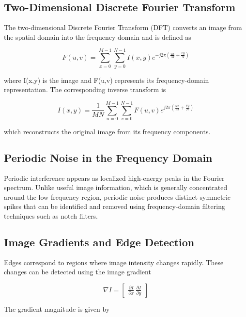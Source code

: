\documentclass[10pt, a4paper, twocolumn]{article}
\begin{document}
\subsection{Two-Dimensional Discrete Fourier Transform}

The two-dimensional Discrete Fourier Transform (DFT) converts an image from the spatial domain into the frequency domain and is defined as

\begin{equation}
F(u,v)=\sum_{x=0}^{M-1}\sum_{y=0}^{N-1}
I(x,y)e^{-j2\pi\left(\frac{ux}{M}+\frac{vy}{N}\right)}
\end{equation}

where I(x,y) is the image and F(u,v) represents its frequency-domain representation. The corresponding inverse transform is

\begin{equation}
I(x,y)=\frac{1}{MN}
\sum_{u=0}^{M-1}\sum_{v=0}^{N-1}
F(u,v)e^{j2\pi\left(\frac{ux}{M}+\frac{vy}{N}\right)}
\end{equation}

which reconstructs the original image from its frequency components.

\subsection{Periodic Noise in the Frequency Domain}

Periodic interference appears as localized high-energy peaks in the Fourier spectrum. Unlike useful image information, which is generally concentrated around the low-frequency region, periodic noise produces distinct symmetric spikes that can be identified and removed using frequency-domain filtering techniques such as notch filters.

\subsection{Image Gradients and Edge Detection}

Edges correspond to regions where image intensity changes rapidly. These changes can be detected using the image gradient

\begin{equation}
\nabla I=
\begin{bmatrix}
\frac{\partial I}{\partial x}\
\frac{\partial I}{\partial y}
\end{bmatrix}
\end{equation}

The gradient magnitude is given by
\end{document}
